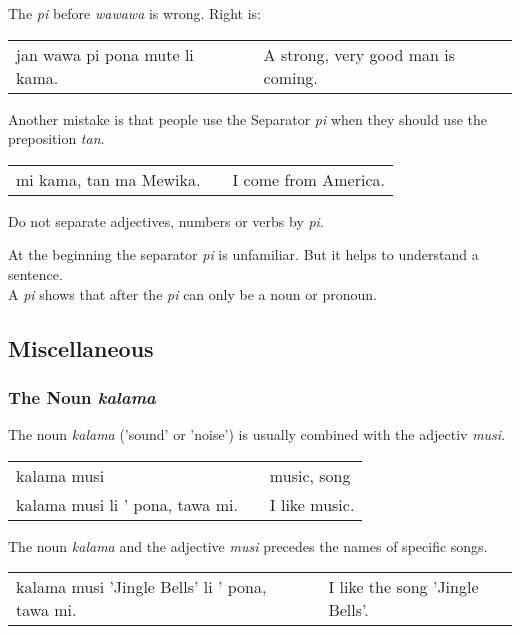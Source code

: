 The \textit{pi} before \textit{wawawa} is wrong. 
Right is: 

\begin{supertabular}{p{5,5cm}|ll}
jan wawa pi pona mute li kama. && A strong, very good man is coming. \\ 
\end{supertabular}

Another mistake is that people use the Separator \textit{pi} when they should use the preposition \textit{tan}. 

\begin{supertabular}{p{5,5cm}|ll}
mi kama, tan ma Mewika. && I come from America. \\
\end{supertabular}  

Do not separate adjectives, numbers or verbs by \textit{pi}.

At the beginning the separator \textit{pi} is unfamiliar. 
But it helps to understand a sentence. \\
A \textit{pi} shows that after the \textit{pi} can only be a noun or pronoun.

%
\newpage
\subsection*{Miscellaneous}
%
\subsubsection*{The Noun \textit{kalama}}
%
%
The noun \textit{kalama} ('sound' or 'noise') is usually combined with the adjectiv \textit{musi}. 

\begin{supertabular}{p{5,5cm}|ll}
kalama musi && music, song \\
kalama musi li ' pona, tawa mi. && I like music. \\
\end{supertabular}  

The noun \textit{kalama} and the adjective \textit{musi} precedes the names of specific songs. 

\begin{supertabular}{p{5,5cm}|ll}
kalama musi 'Jingle Bells' li ' pona, tawa mi. && I like the song 'Jingle Bells'. \\
\end{supertabular}  

